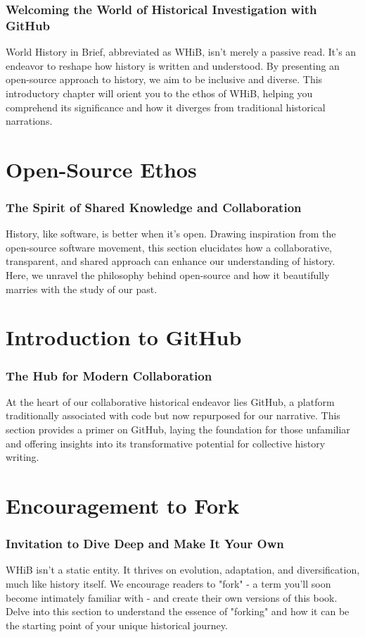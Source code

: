 \documentclass[a4paper,12pt]{book}
\begin{document}
\subsection*{Welcoming the World of Historical Investigation with GitHub}
World History in Brief, abbreviated as WHiB, isn't merely a passive read. It's an endeavor to reshape how history is written and understood. By presenting an open-source approach to history, we aim to be inclusive and diverse. This introductory chapter will orient you to the ethos of WHiB, helping you comprehend its significance and how it diverges from traditional historical narrations.


\chapter{Open-Source Ethos}
\subsection*{The Spirit of Shared Knowledge and Collaboration}
History, like software, is better when it's open. Drawing inspiration from the open-source software movement, this section elucidates how a collaborative, transparent, and shared approach can enhance our understanding of history. Here, we unravel the philosophy behind open-source and how it beautifully marries with the study of our past.

\chapter{Introduction to GitHub}
\subsection*{The Hub for Modern Collaboration}
At the heart of our collaborative historical endeavor lies GitHub, a platform traditionally associated with code but now repurposed for our narrative. This section provides a primer on GitHub, laying the foundation for those unfamiliar and offering insights into its transformative potential for collective history writing.

\chapter{Encouragement to Fork}
\subsection*{Invitation to Dive Deep and Make It Your Own}
WHiB isn't a static entity. It thrives on evolution, adaptation, and diversification, much like history itself. We encourage readers to "fork" - a term you'll soon become intimately familiar with - and create their own versions of this book. Delve into this section to understand the essence of "forking" and how it can be the starting point of your unique historical journey.
\end{document}

